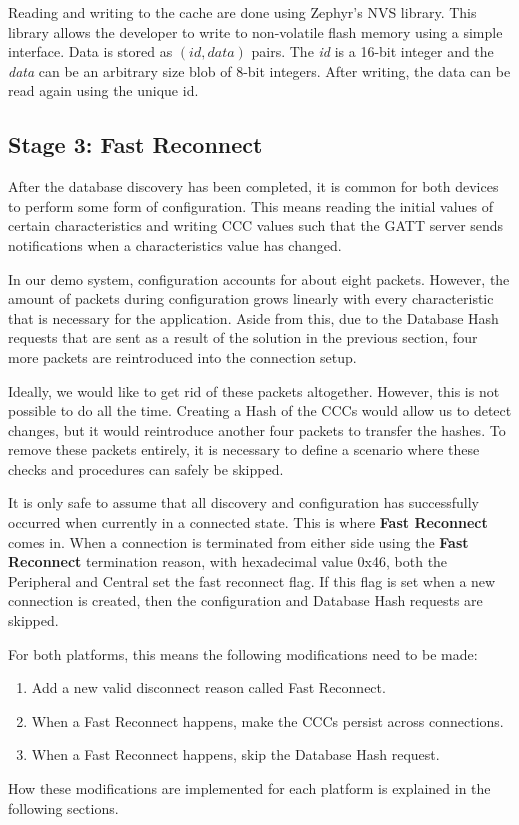 Reading and writing to the cache are done using Zephyr's NVS library. This library allows the developer to write to non-volatile flash memory using a simple interface. Data is stored as $(id, data)$ pairs. The \textit{id} is a 16-bit integer and the \textit{data} can be an arbitrary size blob of 8-bit integers. After writing, the data can be read again using the unique id.


\subsection{Stage 3: Fast Reconnect}
After the database discovery has been completed, it is common for both devices to perform some form of configuration. This means reading the initial values of certain characteristics and writing CCC values such that the GATT server sends notifications when a characteristics value has changed. 

In our demo system, configuration accounts for about eight packets. However, the amount of packets during configuration grows linearly with every characteristic that is necessary for the application. Aside from this, due to the Database Hash requests that are sent as a result of the solution in the previous section, four more packets are reintroduced into the connection setup.

Ideally, we would like to get rid of these packets altogether. However, this is not possible to do all the time. Creating a Hash of the CCCs would allow us to detect changes, but it would reintroduce another four packets to transfer the hashes. To remove these packets entirely, it is necessary to define a scenario where these checks and procedures can safely be skipped.

It is only safe to assume that all discovery and configuration has successfully occurred when currently in a connected state. This is where \textbf{Fast Reconnect} comes in. When a connection is terminated from either side using the \textbf{Fast Reconnect} termination reason, with hexadecimal value 0x46, both the Peripheral and Central set the fast reconnect flag. If this flag is set when a new connection is created, then the configuration and Database Hash requests are skipped. 

For both platforms, this means the following modifications need to be made:
\begin{enumerate}
    \item Add a new valid disconnect reason called Fast Reconnect.
    \item When a Fast Reconnect happens, make the CCCs persist across connections.
    \item When a Fast Reconnect happens, skip the Database Hash request.
\end{enumerate}
How these modifications are implemented for each platform is explained in the following sections.

